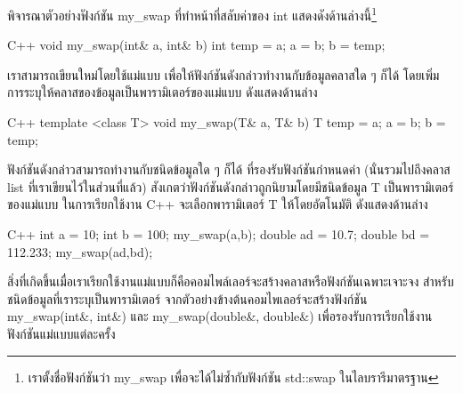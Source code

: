 พิจารณา{\wbr}ตัวอย่าง{\wbr}ฟังก์ชัน {\ct my\_swap} ที่{\wbr}ทำ{\wbr}หน้าที่{\wbr}สลับ{\wbr}ค่า{\wbr}ของ {\ct
  int} แสดง{\wbr}ดัง{\wbr}ด้าน{\wbr}ล่าง{\wbr}นี้\footnote{เรา{\wbr}ตั้ง{\wbr}ชื่อ{\wbr}ฟังก์ชัน{\wbr}ว่า {\ct my\_swap}
  เพื่อ{\wbr}จะ{\wbr}ได้{\wbr}ไม่{\wbr}ซ้ำ{\wbr}กับ{\wbr}ฟังก์ชัน {\ct std::swap} ใน{\wbr}ไลบ{\wbr}รา{\wbr}รี{\wbr}มาตรฐาน}

\latintext
\begin{codelist}{C++}{}
void my_swap(int& a, int& b)
{
  int temp = a;  a = b;  b = temp;
}
\end{codelist}
\thaitext

เรา{\wbr}สามารถ{\wbr}เขียน{\wbr}ใหม่{\wbr}โดย{\wbr}ใช้{\wbr}แม่แบบ เพื่อให้{\wbr}ฟังก์ชัน{\wbr}ดังกล่าว{\wbr}ทำงาน{\wbr}กับ{\wbr}ข้อมูล{\wbr}ค{\wbr}ลา{\wbr}ส{\wbr}ใด ๆ ก็ได้{\wbr}
โดย{\wbr}เพิ่ม{\wbr}การ{\wbr}ระบุ{\wbr}ให้{\wbr}ค{\wbr}ลา{\wbr}ส{\wbr}ของ{\wbr}ข้อมูล{\wbr}เป็น{\wbr}พารามิเตอร์{\wbr}ของ{\wbr}แม่แบบ ดัง{\wbr}แสดง{\wbr}ด้าน{\wbr}ล่าง{\wbr}

\latintext
\begin{codelist}{C++}{}
template <class T> 
void my_swap(T& a, T& b)
{
  T temp = a;  a = b;  b = temp;
}
\end{codelist}
\thaitext

ฟังก์ชัน{\wbr}ดังกล่าว{\wbr}สามารถ{\wbr}ทำงาน{\wbr}กับ{\wbr}ชนิด{\wbr}ข้อมูล{\wbr}ใด ๆ ก็ได้ ที่{\wbr}รองรับ{\wbr}ฟังก์ชัน{\wbr}กำหนด{\wbr}ค่า{\wbr}
(นั่น{\wbr}รวม{\wbr}ไป{\wbr}ถึง{\wbr}ค{\wbr}ลา{\wbr}ส list ที่{\wbr}เรา{\wbr}เขียน{\wbr}ไว้{\wbr}ใน{\wbr}ส่วน{\wbr}ที่แล้ว)
สังเกต{\wbr}ว่า{\wbr}ฟังก์ชัน{\wbr}ดังกล่าว{\wbr}ถูก{\wbr}นิยาม{\wbr}โดย{\wbr}มี{\wbr}ชนิด{\wbr}ข้อมูล {\ct T} เป็น{\wbr}พารามิเตอร์{\wbr}ของ{\wbr}แม่แบบ{\wbr}
ใน{\wbr}การ{\wbr}เรียก{\wbr}ใช้{\wbr}งาน C++ จะ{\wbr}เลือก{\wbr}พารามิเตอร์ {\ct T} ให้{\wbr}โดย{\wbr}อัตโนมัติ ดัง{\wbr}แสดง{\wbr}ด้าน{\wbr}ล่าง{\wbr}

\latintext
\begin{codelist}{C++}{}
  int a = 10; int b = 100;
  my_swap(a,b);
  double ad = 10.7; double bd = 112.233;
  my_swap(ad,bd);
\end{codelist}
\thaitext

สิ่ง{\wbr}ที่{\wbr}เกิด{\wbr}ขึ้น{\wbr}เมื่อ{\wbr}เรา{\wbr}เรียก{\wbr}ใช้{\wbr}งาน{\wbr}แม่แบบ{\wbr}ก็{\wbr}คือ{\wbr}คอมไพล์{\wbr}เลอร์{\wbr}จะ{\wbr}สร้าง{\wbr}ค{\wbr}ลา{\wbr}ส{\wbr}หรือ{\wbr}ฟังก์ชัน{\wbr}เฉพาะเจาะจง{\wbr}
สำหรับ{\wbr}ชนิด{\wbr}ข้อมูล{\wbr}ที่{\wbr}เรา{\wbr}ระบุ{\wbr}เป็น{\wbr}พารามิเตอร์ จาก{\wbr}ตัวอย่าง{\wbr}ข้างต้น{\wbr}คอม{\wbr}ไพ{\wbr}เลอร์{\wbr}จะ{\wbr}สร้าง{\wbr}ฟังก์ชัน{\wbr}
{\ct my\_swap(int\&, int\&)} และ {\ct my\_swap(double\&, double\&)}
เพื่อ{\wbr}รองรับ{\wbr}การ{\wbr}เรียก{\wbr}ใช้{\wbr}งาน{\wbr}ฟังก์ชัน{\wbr}แม่แบบ{\wbr}แต่ละ{\wbr}ครั้ง{\wbr}

